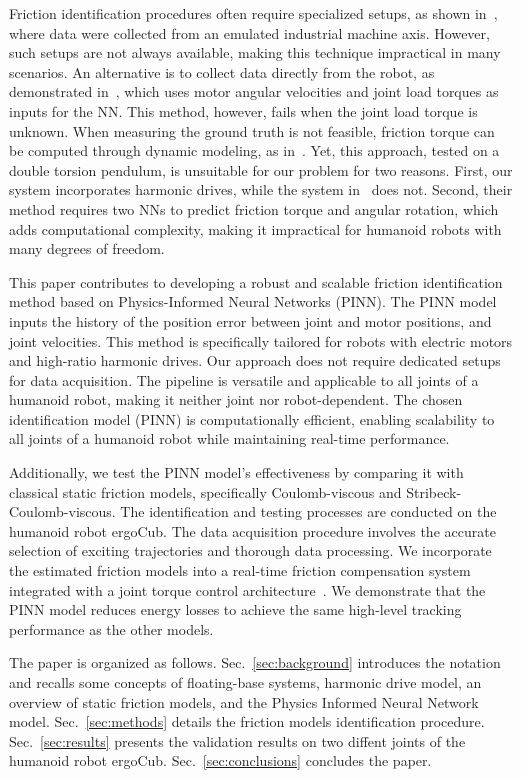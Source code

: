Friction identification procedures often require specialized setups, as shown in~\cite{wang2023improved}, where data were collected from an emulated industrial machine axis. However, such setups are not always available, making this technique impractical in many scenarios. An alternative is to collect data directly from the robot, as demonstrated in~\cite{tu2019modeling}, which uses motor angular velocities and joint load torques as inputs for the NN. This method, however, fails when the joint load torque is unknown. When measuring the ground truth is not feasible, friction torque can be computed through dynamic modeling, as in~\cite{olejnik2023friction}. Yet, this approach, tested on a double torsion pendulum, is unsuitable for our problem for two reasons. First, our system incorporates harmonic drives, while the system in~\cite{olejnik2023friction} does not. Second, their method requires two NNs to predict friction torque and angular rotation, which adds computational complexity, making it impractical for humanoid robots with many degrees of freedom.

This paper contributes to developing a robust and scalable friction identification method based on Physics-Informed Neural Networks (PINN). The PINN model inputs the history of the position error between joint and motor positions, and joint velocities. This method is specifically tailored for robots with electric motors and high-ratio harmonic drives. Our approach does not require dedicated setups for data acquisition. The pipeline is versatile and applicable to all joints of a humanoid robot, making it neither joint nor robot-dependent. The chosen identification model (PINN) is computationally efficient, enabling scalability to all joints of a humanoid robot while maintaining real-time performance.

Additionally, we test the PINN model's effectiveness by comparing it with classical static friction models, specifically Coulomb-viscous and Stribeck-Coulomb-viscous. The identification and testing processes are conducted on the humanoid robot ergoCub. The data acquisition procedure involves the accurate selection of exciting trajectories and thorough data processing. We incorporate the estimated friction models into a real-time friction compensation system integrated with a joint torque control architecture~\cite{sorrentino2024ukf}. We demonstrate that the PINN model reduces energy losses to achieve the same high-level tracking performance as the other models.

The paper is organized as follows. Sec.~\ref{sec:background} introduces the notation and recalls some concepts of floating-base systems, harmonic drive model, an overview of static friction models, and the Physics Informed Neural Network model. Sec.~\ref{sec:methods} details the friction models identification procedure. Sec.~\ref{sec:results} presents the validation results on two diffent joints of the humanoid robot ergoCub. Sec.~\ref{sec:conclusions} concludes the paper.